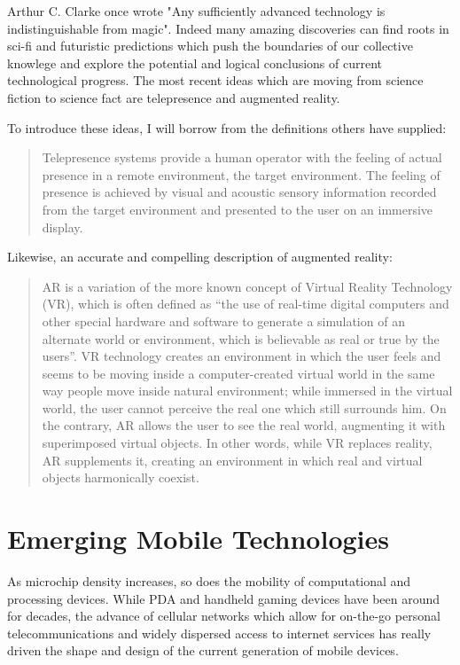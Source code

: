 \documentclass[final,a4paper,12pt]{report}
\begin{document}
Arthur C. Clarke once wrote "Any sufficiently advanced technology is indistinguishable from magic". Indeed many amazing discoveries can find roots in sci-fi and futuristic predictions which push the boundaries of our collective knowlege and explore the potential and logical conclusions of current technological progress. The most recent ideas which are moving from science fiction to science fact are telepresence and augmented reality. 

To introduce these ideas, I will borrow from the definitions others have supplied:
\begin{quotation}
Telepresence systems provide a human operator with the feeling of actual presence in a remote environment, the target environment. The feeling of presence is achieved by visual and acoustic sensory information recorded from the target environment and presented to the user on an immersive display.
	\begin{flushright}
		\cite{6094998}
	\end{flushright}
\end{quotation}

Likewise, an accurate and compelling description of augmented reality:

\begin{quotation}
AR is a variation of the more known concept of Virtual Reality Technology (VR), which is often defined as “the use of real-time digital computers and other special hardware and software to generate a simulation of an alternate world or environment, which is believable as real or true by the users”. VR technology creates an environment in which the user feels and seems to be moving inside a computer-created virtual world in the same way people move inside natural environment; while immersed in the virtual world, the user cannot perceive the real one which still surrounds him. On the contrary, AR allows the user to see the real world, augmenting it with superimposed virtual objects. In other words, while VR replaces reality, AR supplements it, creating an environment in which real and virtual objects harmonically coexist.
	\begin{flushright}
		\cite{5970856}
	\end{flushright}
\end{quotation}

\section{Emerging Mobile Technologies}
As microchip density increases, so does the mobility of computational and processing devices. While PDA and handheld gaming devices have been around for decades, the advance of cellular networks which allow for on-the-go personal telecommunications and widely dispersed access to internet services has really driven the shape and design of the current generation of mobile devices.
\end{document}
